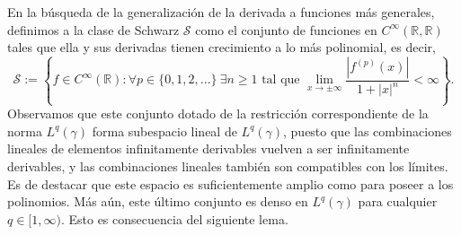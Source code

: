 \documentclass[letterpaper,twoside,12pt]{book}
\newcommand{\R}{\mathbb{R}}
\newcommand{\1}{\mathds{1}}
\renewcommand{\to}{\rightarrow}
\theoremstyle{definition}
\theoremstyle{definition}
\theoremstyle{definition}
\theoremstyle{definition}
\theoremstyle{definition}
\theoremstyle{definition}
\theoremstyle{definition}
\begin{document}
 En la búsqueda de la generalización de la derivada a funciones más generales, definimos a la clase de Schwarz $\mathcal{S}$ como el conjunto de funciones en $C^{\infty}(\R,\R)$ tales que ella y sus derivadas tienen crecimiento a lo más polinomial, es decir,
\[
\mathcal{S}:=\left\{f\in C^{\infty}(\R) : \forall p\in \{0,1,2,...\} \ \exists n\geq1 \text{ tal que }\lim_{x\to\pm\infty}\frac{|f^{(p)}(x)|}{1+|x|^{n}}<\infty \right\}.    
\]
Observamos que este conjunto dotado de la restricción correspondiente de la norma $L^q(\gamma)$ forma subespacio lineal de $L^{q}(\gamma)$, puesto que las combinaciones lineales de elementos infinitamente derivables vuelven a ser infinitamente derivables, y las combinaciones lineales también son compatibles con los límites. Es de destacar que este espacio es suficientemente amplio como para poseer a los polinomios. Más aún, este último conjunto es denso en $L^{q}(\gamma)$ para cualquier $q\in [1,\infty)$. Esto es consecuencia del siguiente lema.
\end{document}
